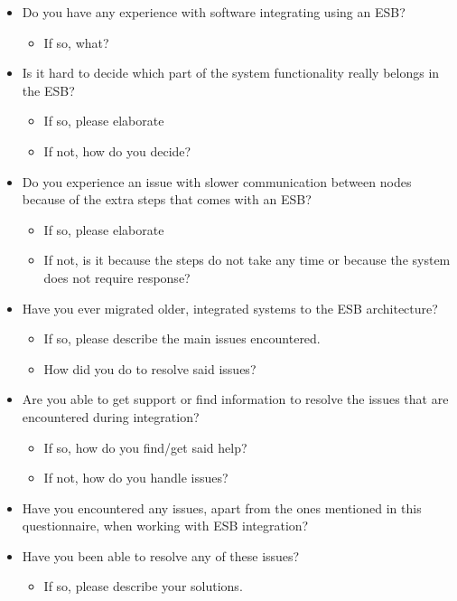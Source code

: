 \documentclass{llncs}
\begin{document}
\begin{itemize}

\item Do you have any experience with software integrating using an ESB?
\begin{itemize}
\item If so, what?
\end{itemize}

\item Is it hard to decide which part of the system functionality really belongs in the ESB?%
\begin{itemize}
\item If so, please elaborate
\item If not, how do you decide?
\end{itemize}

\item Do you experience an issue with slower communication between nodes because of the extra steps that comes with an ESB?
\begin{itemize}
\item If so, please elaborate
\item If not, is it because the steps do not take any time or because the system does not require response?
\end{itemize}

\item Have you ever migrated older, integrated systems to the ESB architecture?
\begin{itemize}
\item If so, please describe the main issues encountered.
\item How did you do to resolve said issues?
\end{itemize}

\item Are you able to get support or find information to resolve the issues that are encountered during integration?
\begin{itemize}
\item If so, how do you find/get said help?
\item If not, how do you handle issues?
\end{itemize}

\item Have you encountered any issues, apart from the ones mentioned in this questionnaire, when working with ESB integration?

\item Have you been able to resolve any of these issues?
\begin{itemize}
\item If so, please describe your solutions.
\end{itemize}

\end{itemize}
\end{document}

